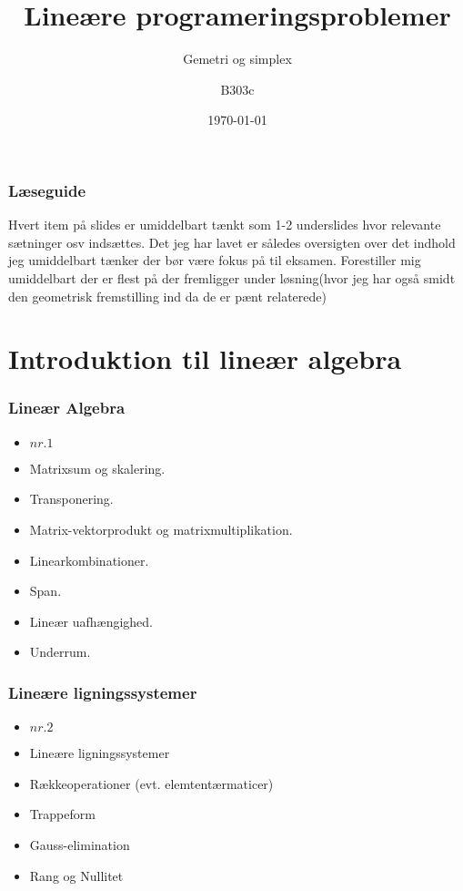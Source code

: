 \documentclass{beamer}
\title{Lineære programeringsproblemer}
\subtitle{Gemetri og simplex}
\author{B303c}
\institute{Aalborg Universitet}
\date{\today}
\begin{document}
\begin{frame}
\frametitle{Læseguide}
Hvert item på slides er umiddelbart tænkt som 1-2 underslides hvor relevante sætninger osv indsættes.
Det jeg har lavet er således oversigten over det indhold jeg umiddelbart tænker der bør være fokus på til eksamen.
Forestiller mig umiddelbart der er flest på der fremligger under løsning(hvor jeg har også smidt den geometrisk fremstilling ind da de er pænt relaterede)
\end{frame}

\section{Introduktion til lineær algebra}

\begin{frame}
\frametitle{Lineær Algebra}
\begin{itemize}
\item \textbf{$nr. 1$}
\item Matrixsum og skalering.
\item Transponering.
\item Matrix-vektorprodukt og matrixmultiplikation.
\item Linearkombinationer.
\item Span.
\item Lineær uafhængighed.
\item Underrum.
\end{itemize}
\end{frame}

\begin{frame}
\frametitle{Lineære ligningssystemer}
\begin{itemize}
\item \textbf{$nr. 2$}
\item Lineære ligningssystemer
\item Rækkeoperationer (evt. elemtentærmaticer)
\item Trappeform
\item Gauss-elimination
\item Rang og Nullitet
\end{itemize}
\end{frame}
%
\end{document}
